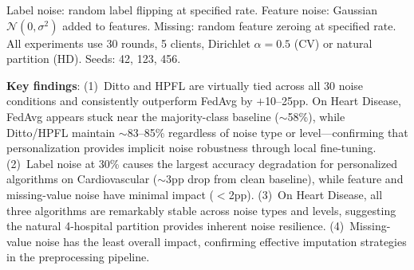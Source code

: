 \documentclass[conference]{IEEEtran}
\begin{document}
\begin{table}[htbp]
\centering
\caption{Data Quality Stress: Best Accuracy (\%) Under Noise Injection (Mean over 3 Seeds)}
\label{tab:data_quality_stress}
\par{\footnotesize Label noise: random label flipping at specified rate. Feature noise: Gaussian $\mathcal{N}(0, \sigma^2)$ added to features. Missing: random feature zeroing at specified rate. All experiments use 30 rounds, 5 clients, Dirichlet $\alpha{=}0.5$ (CV) or natural partition (HD). Seeds: 42, 123, 456.}
\end{table}

\textbf{Key findings}: (1)~Ditto and HPFL are virtually tied across all 30 noise conditions and consistently outperform FedAvg by $+$10--25pp. On Heart Disease, FedAvg appears stuck near the majority-class baseline ($\sim$58\%), while Ditto/HPFL maintain $\sim$83--85\% regardless of noise type or level---confirming that personalization provides implicit noise robustness through local fine-tuning. (2)~Label noise at 30\% causes the largest accuracy degradation for personalized algorithms on Cardiovascular ($\sim$3pp drop from clean baseline), while feature and missing-value noise have minimal impact ($<$2pp). (3)~On Heart Disease, all three algorithms are remarkably stable across noise types and levels, suggesting the natural 4-hospital partition provides inherent noise resilience. (4)~Missing-value noise has the least overall impact, confirming effective imputation strategies in the preprocessing pipeline.
\end{document}
